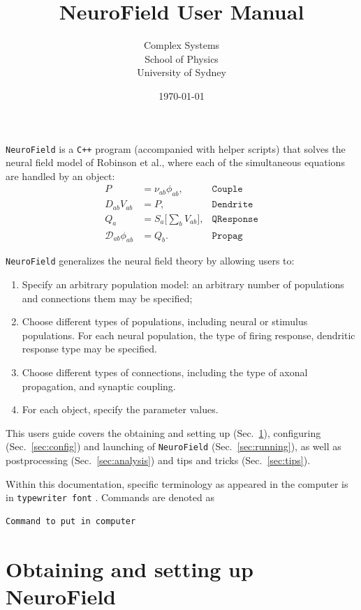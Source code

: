 \documentclass[12pt,a4paper]{article}
\title{NeuroField User Manual}
\author{Complex Systems\\School of Physics\\University of Sydney}
\date{\today}
\newcommand{\type}[1]{ {\small\small\tt #1} }
\newcommand{\NF}[0]{ \type{NeuroField}}
\begin{document}
\maketitle

\NF is a \type{C++} program (accompanied with helper scripts) that solves the neural field model of Robinson et al., where each of the simultaneous equations are handled by an object:
\begin{align*}
	P &= \nu_{ab}\phi_{ab}, & \mathtt{Couple}\\
	D_{ab}V_{ab} &= P, & \mathtt{Dendrite}\\
	Q_a &= S_a \big[\sum_b V_{ab} \big], & \mathtt{QResponse}\\
	\mathcal{D}_{ab}\phi_{ab} &= Q_b.&  \mathtt{Propag}
\end{align*}

\NF generalizes the neural field theory by allowing users to:
\begin{enumerate}
	\item Specify an arbitrary population model: an arbitrary number of populations and connections them may be specified;
	\item Choose different types of populations, including neural or stimulus populations. For each neural population, the type of firing response, dendritic response type may be specified.
	\item Choose different types of connections, including the type of axonal propagation, and synaptic coupling.
	\item For each object, specify the parameter values.
\end{enumerate}

This users guide covers the obtaining and setting up (Sec.~\ref{sec:obtain}), configuring (Sec.~\ref{sec:config}) and launching of \NF (Sec.~\ref{sec:running}), as well as postprocessing (Sec.~\ref{sec:analysis}) and tips and tricks (Sec.~\ref{sec:tips}).

Within this documentation, specific terminology as appeared in the computer is in \type{typewriter font}. Commands are denoted as
\begin{lstlisting}
Command to put in computer
\end{lstlisting}

\pagebreak
\tableofcontents

\section{Obtaining and setting up NeuroField}
\label{sec:obtain}
\end{document}
